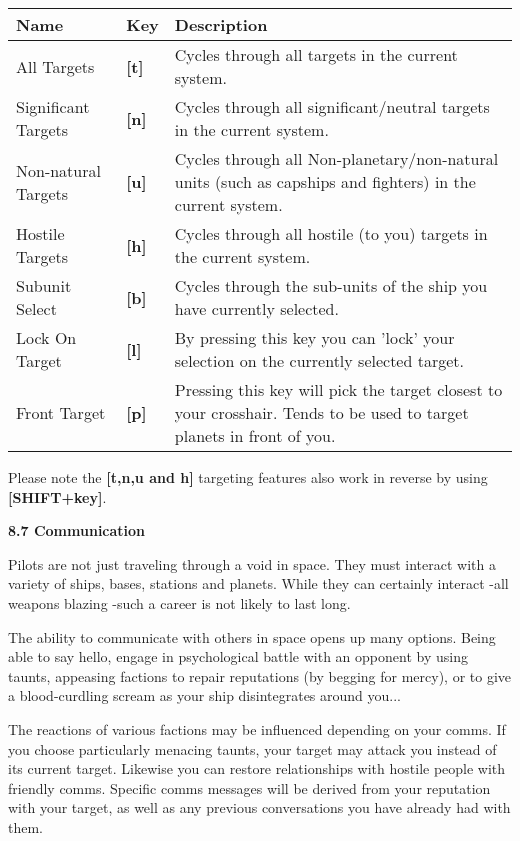 \documentclass{article}
\begin{document}
\begin{tabular}{|p{0.8in}|p{0.3in}|p{3.8in}|} \hline 
\textbf{ Name } & \textbf{Key } & \textbf{Description } \\ \hline 
 All Targets  & \textbf{[t] } & Cycles through all targets in the current system.   \\ \hline 
 Significant Targets   & \textbf{[n] } & Cycles through all significant/neutral targets in the current system.   \\ \hline 
Non-natural Targets   & \textbf{[u] } & Cycles through all Non-planetary/non-natural units (such as capships and fighters) in the current system.   \\ \hline 
 Hostile Targets  & \textbf{[h] } & Cycles through all hostile (to you) targets in the current system.   \\ \hline 
Subunit Select  & \textbf{[b] } & Cycles through the sub-units of the ship you have currently selected.   \\ \hline 
Lock On Target  & \textbf{[l] } & By pressing this key you can 'lock' your selection on the currently selected target.  \\ \hline 
 Front Target  & \textbf{[p] } & Pressing this key will pick the target closest to your crosshair. Tends to be used to target planets in front of you.   \\ \hline 
\end{tabular}



Please note the \textbf{[t,n,u and h]} targeting features also work in reverse by using \textbf{[SHIFT+key]}. 

\textbf{}

\textbf{}

\textbf{}

\textbf{}

\textbf{8.7 Communication }

Pilots are not just traveling through a void in space. They must interact with a variety of ships, bases, stations and planets. While they can certainly interact -all weapons blazing -such a career is not likely to last long. 

The ability to communicate with others in space opens up many options. Being able to say hello, engage in psychological battle with an opponent by using taunts, appeasing factions to repair reputations (by begging for mercy), or to give a blood-curdling scream as your ship disintegrates around you... 

The reactions of various factions may be influenced depending on your comms. If you choose particularly menacing taunts, your target may attack you instead of its current target. Likewise you can restore relationships with hostile people with friendly comms. Specific comms messages will be derived from your reputation with your target, as well as any previous conversations you have already had with them. 
\end{document}
